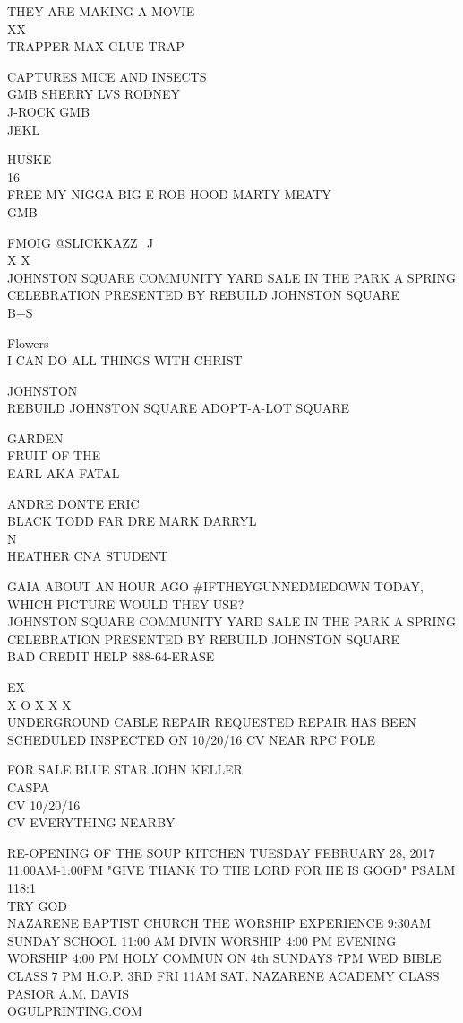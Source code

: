 \documentclass[10pt,letterpaper]{article}
\begin{document}
THEY ARE MAKING A MOVIE\\
XX\\
TRAPPER MAX GLUE TRAP

CAPTURES MICE AND INSECTS\\
GMB SHERRY LVS RODNEY\\
J{-}ROCK GMB\\
JEKL

HUSKE\\
16\\
FREE MY NIGGA BIG E ROB HOOD MARTY MEATY\\
GMB

FMOIG @SLICKKAZZ\_J\\
X X\\
JOHNSTON SQUARE COMMUNITY YARD SALE IN THE PARK A SPRING CELEBRATION PRESENTED BY REBUILD JOHNSTON SQUARE\\
B+S

Flowers\\
I CAN DO ALL THINGS WITH CHRIST

JOHNSTON\\
REBUILD JOHNSTON SQUARE ADOPT{-}A{-}LOT SQUARE

GARDEN\\
FRUIT OF THE\\
EARL AKA FATAL

ANDRE DONTE ERIC\\
BLACK TODD FAR DRE MARK DARRYL\\
N\\
HEATHER CNA STUDENT

GAIA ABOUT AN HOUR AGO \#IFTHEYGUNNEDMEDOWN TODAY, WHICH PICTURE WOULD THEY USE?\\
JOHNSTON SQUARE COMMUNITY YARD SALE IN THE PARK A SPRING CELEBRATION PRESENTED BY REBUILD JOHNSTON SQUARE\\
BAD CREDIT HELP 888{-}64{-}ERASE

EX\\
X O X X X\\
UNDERGROUND CABLE REPAIR REQUESTED REPAIR HAS BEEN SCHEDULED INSPECTED ON 10/20/16 CV NEAR RPC POLE

FOR SALE BLUE STAR JOHN KELLER\\
CASPA\\
CV 10/20/16\\
CV EVERYTHING NEARBY

RE{-}OPENING OF THE SOUP KITCHEN TUESDAY FEBRUARY 28, 2017 11:00AM{-}1:00PM "GIVE THANK TO THE LORD FOR HE IS GOOD" PSALM 118:1\\
TRY GOD\\
NAZARENE BAPTIST CHURCH THE WORSHIP EXPERIENCE 9:30AM SUNDAY SCHOOL 11:00 AM DIVIN WORSHIP 4:00 PM EVENING WORSHIP 4:00 PM HOLY COMMUN ON 4th SUNDAYS 7PM WED BIBLE CLASS 7 PM H.O.P. 3RD FRI 11AM SAT. NAZARENE ACADEMY CLASS PASIOR A.M. DAVIS\\
OGULPRINTING.COM
\end{document}
